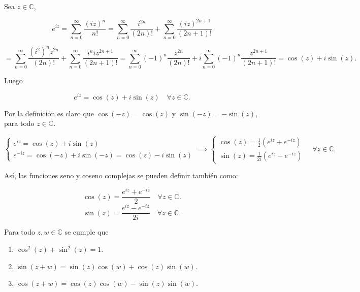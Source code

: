 Sea $z \in \mathbb{C}$,

\[
    e^{iz} = \sum_{n=0}^{\infty} \frac{(iz)^n}{n!} = \sum_{n=0}^{\infty} \frac{i^{2n}}{(2n)!} + \sum_{n=0}^{\infty} \frac{(iz)^{2n+1}}{(2n+1)!} 
\]

\[
    = \sum_{n=0}^{\infty} \frac{{}(i^2)^n z^{2n}}{(2n)!} + \sum_{n=0}^{\infty} \frac{i^{n} i z^{2n+1}}{(2n+1)!} = \sum_{n=0}^{\infty} (-1)^n \frac{z^{2n}}{(2n)!} + i\sum_{n=0}^{\infty} (-1)^n \frac{z^{2n+1}}{(2n+1)!} = \cos(z) + i\sin(z).	
\]

Luego 

\[
    e^{iz} = \cos(z) + i\sin(z) \quad \forall z \in \mathbb{C}.
\]

\begin{definición}
    Por la definición es claro que $\cos(-z) = \cos(z)$ y $\sin(-z) = -\sin(z)$, para todo $z \in \mathbb{C}$. 

\[
    \begin{cases}
        e^{iz} = \cos(z) + i\sin(z) \\
        e^{-iz} = \cos(-z) + i\sin(-z) = \cos(z) - i\sin(z)
    \end{cases} \implies \begin{cases}
        \cos(z) = \frac{1}{2}(e^{iz} + e^{-iz}) \\
        \sin(z) = \frac{1}{2i}(e^{iz} - e^{-iz})
    \end{cases} \quad \forall z \in \mathbb{C}.
\]  

Así, las funciones seno y coseno complejas se pueden definir también como:

\[
\cos(z) = \frac{e^{iz} + e^{-iz}}{2}
\quad \forall z \in \mathbb{C}.
\]
\[
\sin(z) = \frac{e^{iz} - e^{-iz}}{2i}
\quad \forall z \in \mathbb{C}.
\]

\end{definición}

\begin{proposición}
    Para todo $z,w \in \mathbb{C}$ se cumple que
    \begin{enumerate}
        \item $\cos^2(z) + \sin^2(z) = 1$.
        \item $\sin(z+w) = \sin(z)\cos(w) + \cos(z)\sin(w)$.
        \item $\cos(z+w) = \cos(z)\cos(w) - \sin(z)\sin(w)$.
    \end{enumerate}
\end{proposición}

